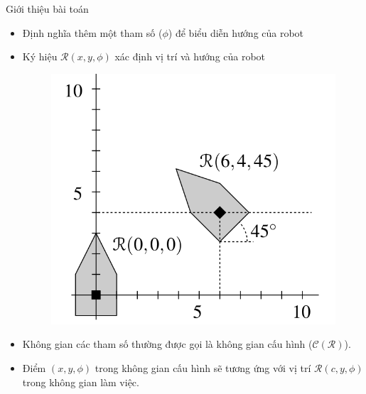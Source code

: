 \documentclass[compress]{beamer}
\begin{document}
\begin{frame}{Giới thiệu bài toán}
\begin{itemize}
\item Định nghĩa thêm một tham số ($\phi$) để biểu diễn hướng của robot
\item Ký hiệu $\mathcal{R}(x,y,\phi)$ xác định vị trí và hướng của robot
\begin{figure}[H]
\centering
\includegraphics[scale=0.2]{work_space_with_rotate.png}
\end{figure}
\item Không gian các tham số thường được gọi là không gian cấu hình ($\mathcal{C}(\mathcal{R})$). 
\item Điểm $(x,y,\phi)$ trong không gian cấu hình sẽ tương ứng với vị trí $\mathcal{R}(c,y,\phi)$ trong không gian làm việc.
\end{itemize}
\end{frame}
\end{document}
